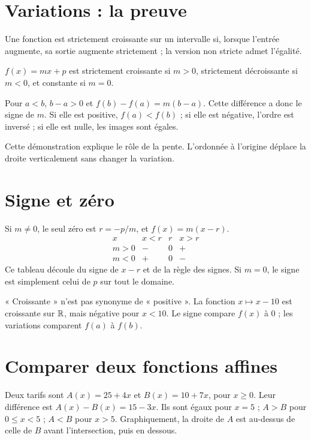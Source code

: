 \documentclass[../cours_2de.tex]{subfiles}
\begin{document}
\section{Variations : la preuve}
Une fonction est strictement croissante sur un intervalle si, lorsque l'entrée augmente, sa sortie augmente strictement ; la version non stricte admet l'égalité.
\begin{theoreme}
$f(x)=mx+p$ est strictement croissante si $m>0$, strictement décroissante si $m<0$, et constante si $m=0$.
\end{theoreme}
\begin{demonstration}
Pour $a<b$, $b-a>0$ et $f(b)-f(a)=m(b-a)$.
Cette différence a donc le signe de $m$. Si elle est positive, $f(a)<f(b)$ ; si elle est négative, l'ordre est inversé ; si elle est nulle, les images sont égales.
\end{demonstration}
Cette démonstration explique le rôle de la pente. L'ordonnée à l'origine déplace la droite verticalement sans changer la variation.
\section{Signe et zéro}
Si $m\ne0$, le seul zéro est $r=-p/m$, et $f(x)=m(x-r)$.
\[
\begin{array}{c|ccc}
x&x<r&r&x>r\\\hline
m>0&-&0&+\\
m<0&+&0&-
\end{array}
\]
Ce tableau découle du signe de $x-r$ et de la règle des signes.
Si $m=0$, le signe est simplement celui de $p$ sur tout le domaine.
\begin{attention}
« Croissante » n'est pas synonyme de « positive ». La fonction $x\mapsto x-10$ est croissante sur $\mathbb{R}$, mais négative pour $x<10$. Le signe compare $f(x)$ à $0$ ; les variations comparent $f(a)$ à $f(b)$.
\end{attention}
\section{Comparer deux fonctions affines}
\begin{exemple}
Deux tarifs sont $A(x)=25+4x$ et $B(x)=10+7x$, pour $x\geq0$.
Leur différence est $A(x)-B(x)=15-3x$.
Ils sont égaux pour $x=5$ ; $A>B$ pour $0\leq x<5$ ; $A<B$ pour $x>5$.
Graphiquement, la droite de $A$ est au-dessus de celle de $B$ avant l'intersection, puis en dessous.
\end{exemple}
\begin{center}
\end{center}
\end{document}
